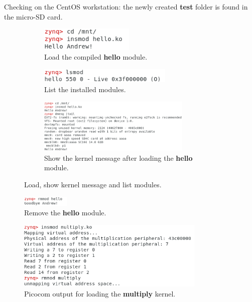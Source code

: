 \documentclass[11pt,letterpaper,titlepage]{article}
\begin{document}
Checking on the CentOS workstation: the newly created \textbf{test} folder is found in the micro-SD card.

\newpage

\begin{figure}[ht]
    \centering
    \begin{subfigure}[b]{0.49\textwidth}
    \includegraphics[width=0.49\textwidth]{5.Load_Hello_Module.png}
    \caption{Load the compiled \textbf{hello} module.}
    \end{subfigure}
    \begin{subfigure}[b]{0.49\textwidth}
    \includegraphics[width=0.7\textwidth]{7.lsmod.png}
    \caption{List the installed modules.}
    \end{subfigure}
    \begin{subfigure}[b]{\textwidth}
    \includegraphics[width=0.8\textwidth]{6.Show_Kernel_Message.png}
    \caption{Show the kernel message after loading the \textbf{hello} module.}
    \end{subfigure}
    \caption{Load, show kernel message and list modules.}
\end{figure}

\begin{figure}[ht]
    \centering
    \includegraphics[width=0.2\textwidth]{8.rmmod.png}
    \caption{Remove the \textbf{hello} module.}
\end{figure}

\begin{figure}[ht]
    \centering
    \includegraphics[width=0.8\textwidth]{9.Multiplier.png}
    \caption{Picocom output for loading the \textbf{multiply} kernel.}
\end{figure}
\end{document}
